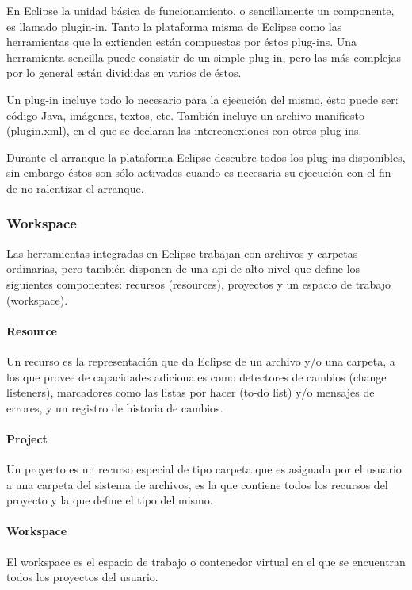 \documentclass[a4paper,12pt,oneside,spanish]{book}
\begin{document}
En Eclipse la unidad básica de funcionamiento, o sencillamente un componente, es llamado plugin-in. Tanto la plataforma misma de Eclipse como las herramientas que la extienden están compuestas por éstos plug-ins. Una herramienta sencilla puede consistir de un simple plug-in, pero las más complejas por lo general están divididas en varios de éstos.

Un plug-in incluye todo lo necesario para la ejecución del mismo, ésto puede ser: código Java, imágenes, textos, etc. También incluye un archivo manifiesto (plugin.xml), en el que se declaran las interconexiones con otros plug-ins.

Durante el arranque la plataforma Eclipse descubre todos los plug-ins disponibles, sin embargo éstos son sólo activados cuando es necesaria su ejecución con el fin de no ralentizar el arranque.


\subsubsection{Workspace}

Las herramientas integradas en Eclipse trabajan con archivos y carpetas ordinarias, pero también disponen de una \gls{api} de alto nivel que define los siguientes componentes: recursos (resources), proyectos y un espacio de trabajo (workspace).

\paragraph{Resource} Un recurso es la representación que da Eclipse de un archivo y/o una carpeta, a los que provee de capacidades adicionales como detectores de cambios (change listeners), marcadores como las listas por hacer (to-do list) y/o mensajes de errores, y un registro de historia de cambios.

\paragraph{Project} Un proyecto es un recurso especial de tipo carpeta que es asignada por el usuario a una carpeta del sistema de archivos, es la que contiene todos los recursos del proyecto y la que define el tipo del mismo.

\paragraph{Workspace} El workspace es el espacio de trabajo o contenedor virtual en el que se encuentran todos los proyectos del usuario.
\end{document}
